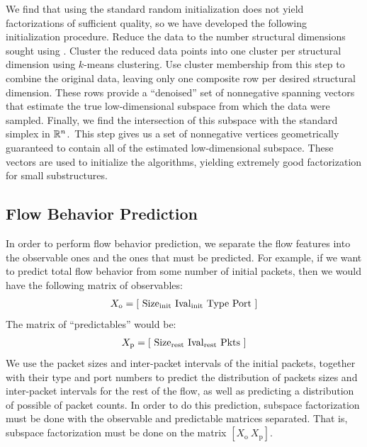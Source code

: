 \documentclass[conference]{IEEEtran}
\begin{document}

We find that using the standard random  initialization does not yield factorizations of sufficient quality, so we have developed the following initialization procedure.
Reduce the data to the number structural dimensions sought using .
Cluster the reduced data points into one cluster per structural dimension using $k$-means clustering.
Use cluster membership from this step to combine the original data, leaving only one composite row per desired structural dimension.
These rows provide a ``denoised'' set of nonnegative spanning vectors that estimate the true low-dimensional subspace from which the data were sampled.
Finally, we find the intersection of this subspace with the standard simplex in $\mathbb{R}^n$.\,\cddnote
This step gives us a set of nonnegative vertices geometrically guaranteed to contain all of the estimated low-dimensional subspace.
These vectors are used to initialize the  algorithms, yielding extremely good factorization for small substructures.

\subsection{Flow Behavior Prediction}

In order to perform flow behavior prediction, we separate the flow features into the observable ones and the ones that must be predicted.
For example, if we want to predict total flow behavior from some number of initial packets, then we would have the following matrix of observables:
\begin{align}
  X_\text{o} = {\left[ ~
    \text{Size}_{\text{init}} ~
    \text{Ival}_{\text{init}} ~
    \text{Type} ~
    \text{Port} ~
  \right]}
\end{align}
The matrix of ``predictables'' would be:
\begin{align}
  X_\text{p} = {\left[ ~
    \text{Size}_{\text{rest}} ~
    \text{Ival}_{\text{rest}} ~
    \text{Pkts} ~
  \right]}
\end{align}
We use the packet sizes and inter-packet intervals of the initial packets, together with their  type and port numbers to predict the distribution of packets sizes and inter-packet intervals for the rest of the flow, as well as predicting a distribution of possible of packet counts.
In order to do this prediction, subspace factorization must be done with the observable and predictable matrices separated.
That is, subspace factorization must be done on the matrix $[X_\text{o}~X_\text{p}]$.
\end{document}
